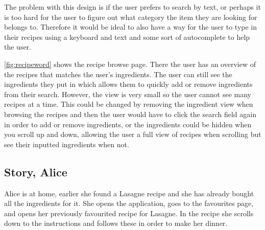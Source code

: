 The problem with this design is if the user prefers to search by text, or perhaps it is too hard for the user to figure out what category the item they are looking for belongs to. Therefore it would be ideal to also have a way for the user to type in their recipes using a keyboard and text and some sort of autocomplete to help the user.

\autoref{fig:recipeword} shows the recipe browse page. There the user has an overview of the recipes that matches the user's ingredients. The user can still see the ingredients they put in which allows them to quickly add or remove ingredients from their search. However, the view is very small so the user cannot see many recipes at a time. This could be changed by removing the ingredient view when browsing the recipes and then the user would have to click the search field again in order to add or remove ingredients, or the ingredients could be hidden when you scroll up and down, allowing the user a full view of recipes when scrolling but see their inputted ingredients when not. 

\subsection*{Story, Alice}

Alice is at home, earlier she found a Lasagne recipe and she has already bought all the ingredients for it. She opens the application, goes to the favourites page, and opens her previously favourited recipe for Lasagne. In the recipe she scrolls down to the instructions and follows these in order to make her dinner.


